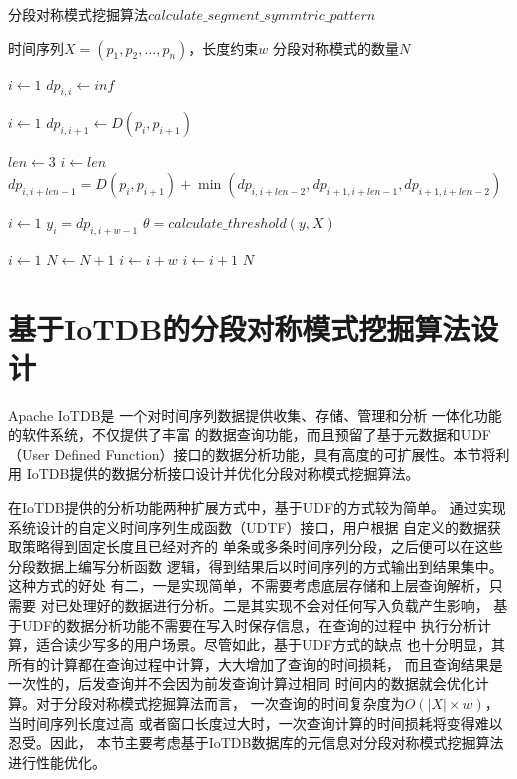 \begin{algorithm}[t]
  \caption{分段对称模式挖掘算法$calculate\_segment\_symmtric\_pattern$}
  \label{alg:symmetric_pattern}
  \small
  \begin{algorithmic}
    \REQUIRE 时间序列$X=\left(p_{1}, p_{2}, \dots, p_{n}\right)$，长度约束$w$
    \ENSURE 分段对称模式的数量$N$

    \STATE $i \leftarrow 1$
    \STATE $dp_{i,i} \leftarrow inf$
    \ENDWHILE

    \STATE $i \leftarrow 1$
    \STATE $dp_{i,i+1} \leftarrow D\left(p_{i}, p_{i+1}\right)$
    \ENDWHILE

    \STATE $len \leftarrow 3$
    \STATE $i \leftarrow len$
    \STATE $dp_{i,i+len-1} = D\left(p_{i}, p_{i+1}\right)+\min \left(dp_{i,i+len-2},dp_{i+1,i+len-1},dp_{i+1,i+len-2}\right)$
    \ENDWHILE
    \ENDWHILE

    \STATE $i \leftarrow 1$
    \STATE $y_i=dp_{i,i+w-1}$
    \ENDWHILE
    \STATE $\theta = calculate\_threshold\left(y,X\right)$

    \STATE $i \leftarrow 1$
    \STATE $N \leftarrow N + 1$
    \STATE $i \leftarrow i+w$
    \ELSE
    \STATE $i \leftarrow i+1$
    \ENDIF
    \ENDWHILE
    \RETURN $N$
  \end{algorithmic}
\end{algorithm}

\section{基于IoTDB的分段对称模式挖掘算法设计}

Apache IoTDB是
一个对时间序列数据提供收集、存储、管理和分析
一体化功能的软件系统，不仅提供了丰富
的数据查询功能，而且预留了基于元数据和UDF（User Defined 
Function）接口的数据分析功能，具有高度的可扩展性。本节将利用
IoTDB提供的数据分析接口设计并优化分段对称模式挖掘算法。

在IoTDB提供的分析功能两种扩展方式中，基于UDF的方式较为简单。
通过实现系统设计的自定义时间序列生成函数（UDTF）接口，用户根据
自定义的数据获取策略得到固定长度且已经对齐的
单条或多条时间序列分段，之后便可以在这些分段数据上编写分析函数
逻辑，得到结果后以时间序列的方式输出到结果集中。这种方式的好处
有二，一是实现简单，不需要考虑底层存储和上层查询解析，只需要
对已处理好的数据进行分析。二是其实现不会对任何写入负载产生影响，
基于UDF的数据分析功能不需要在写入时保存信息，在查询的过程中
执行分析计算，适合读少写多的用户场景。尽管如此，基于UDF方式的缺点
也十分明显，其所有的计算都在查询过程中计算，大大增加了查询的时间损耗，
而且查询结果是一次性的，后发查询并不会因为前发查询计算过相同
时间内的数据就会优化计算。对于分段对称模式挖掘算法而言，
一次查询的时间复杂度为$O(|X| \times w)$，当时间序列长度过高
或者窗口长度过大时，一次查询计算的时间损耗将变得难以忍受。因此，
本节主要考虑基于IoTDB数据库的元信息对分段对称模式挖掘算法进行性能优化。

